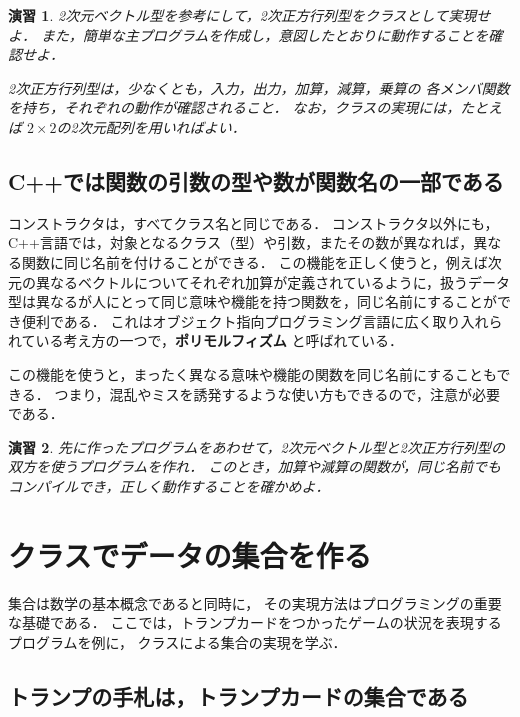 \documentclass[11pt,a4,epsf]{jarticle}
\newtheorem{exerc}{演習}
\begin{document}
\begin{exerc} %
2次元ベクトル型を参考にして，2次正方行列型をクラスとして実現せよ．
また，簡単な主プログラムを作成し，意図したとおりに動作することを確認せよ．

2次正方行列型は，少なくとも，入力，出力，加算，減算，乗算の
各メンバ関数を持ち，それぞれの動作が確認されること．
なお，クラスの実現には，たとえば $2 \times 2$の2次元配列を用いればよい．

\end{exerc} %


\subsection{C++では関数の引数の型や数が関数名の一部である}

コンストラクタは，すべてクラス名と同じである．
コンストラクタ以外にも，C++言語では，対象となるクラス（型）や引数，またその数が異なれば，異なる関数に同じ名前を付けることができる．
この機能を正しく使うと，例えば次元の異なるベクトルについてそれぞれ加算が定義されているように，扱うデータ型は異なるが人にとって同じ意味や機能を持つ関数を，同じ名前にすることができ便利である．
これはオブジェクト指向プログラミング言語に広く取り入れられている考え方の一つで，{\bf ポリモルフィズム} と呼ばれている．

この機能を使うと，まったく異なる意味や機能の関数を同じ名前にすることもできる．
つまり，混乱やミスを誘発するような使い方もできるので，注意が必要である．

\begin{exerc} %
先に作ったプログラムをあわせて，2次元ベクトル型と2次正方行列型の双方を使うプログラムを作れ．
このとき，加算や減算の関数が，同じ名前でもコンパイルでき，正しく動作することを確かめよ．
\end{exerc} %


\section{クラスでデータの集合を作る}

集合は数学の基本概念であると同時に，
その実現方法はプログラミングの重要な基礎である．
ここでは，トランプカードをつかったゲームの状況を表現するプログラムを例に，
クラスによる集合の実現を学ぶ．

\subsection{トランプの手札は，トランプカードの集合である}
\end{document}
